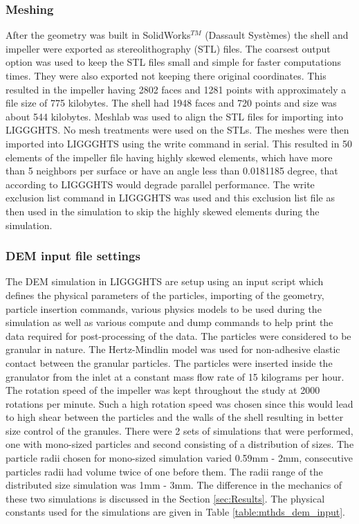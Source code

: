 \documentclass[preprint,11pt,authoryear]{elsarticle}
\begin{document}
\subsubsection{Meshing}
 After the geometry was built in SolidWorks$^{TM}$ (Dassault Syst\`{e}mes) the shell and impeller 
were exported as stereolithography (STL) files. The coarsest output option was used to keep the STL files small and 
simple for faster computations times. They were also exported not keeping there original coordinates.  
This resulted in the impeller having 2802 faces and 1281 points with approximately a file size of 775 
kilobytes. The shell had 1948 faces and 720 points and size was about 544 kilobytes.  
 Meshlab was used to align the STL files for importing into LIGGGHTS. No mesh treatments were 
used on the STLs. 
 The meshes were then imported into LIGGGHTS using the write command in serial. This resulted 
in 50 elements of the impeller file having highly skewed elements, which have more than 5 
neighbors per surface or have an angle less than 0.0181185 degree, that according to LIGGGHTS 
would degrade parallel performance. The write exclusion list command in LIGGGHTS was used and 
this exclusion list file as then used in the simulation to skip the highly skewed elements during the simulation. 

\subsubsection{DEM input file settings}
The DEM simulation in LIGGGHTS are setup using an input script which defines the physical 
parameters of the particles, importing of the geometry, particle insertion commands, various physics 
models to be used during the simulation as well as various compute and dump commands to help print 
the data required for post-processing of the data. The particles were considered to be granular in 
nature. The Hertz-Mindlin model was used for non-adhesive elastic contact between the granular particles. 
The particles were inserted inside the granulator from the inlet at a constant mass flow rate of 15 
kilograms per hour. The rotation speed of the impeller was kept throughout the study at 2000 rotations 
per minute. Such a high rotation speed was chosen since this would lead to high shear between the 
particles and the walls of the shell resulting in better size control of the granules. There were 2 sets of 
simulations that were performed, one with mono-sized particles and second consisting of a distribution 
of sizes. The particle radii chosen for mono-sized simulation varied 0.59mm - 2mm, consecutive 
particles radii had volume twice of one before them. The radii range of the distributed size simulation 
was 1mm - 3mm. The difference in the mechanics of these two simulations is discussed in the Section \ref{sec:Results}. 
The physical constants used for the simulations are given in Table 
\ref{table:mthds_dem_input}.
\end{document}
